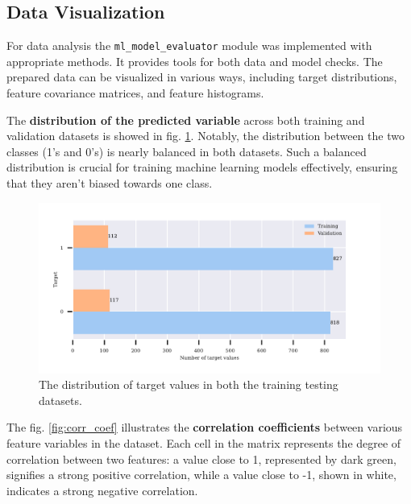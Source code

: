 \subsection{Data Visualization}
For data analysis the \texttt{ml\_model\_evaluator} module was implemented with appropriate methods. It provides tools for both data and model checks.
The prepared data can be visualized in various ways, including target distributions, feature covariance matrices, and feature histograms.

The \textbf{distribution of the predicted variable} across both training and validation datasets is showed in fig. \ref{fig:signal_distribution}.
Notably, the distribution between the two classes (1's and 0's) is nearly balanced in both datasets. Such a balanced distribution is crucial for training machine learning models effectively, ensuring that they aren't biased towards one class.

\begin{figure}[h]
\centering
\begin{adjustbox}{max width=1\textwidth,center}
    \includegraphics[scale=1]{./pdf/report/sig_distr.pdf}
\end{adjustbox}
    \caption{The distribution of target values in both the training testing datasets.}
\label{fig:signal_distribution}
\end{figure}

The fig. \ref{fig:corr_coef} illustrates the \textbf{correlation coefficients} between various feature variables in the dataset.
Each cell in the matrix represents the degree of correlation between two features: a value close to 1, represented by dark green, signifies a strong positive correlation, while a value close to -1, shown in white, indicates a strong negative correlation.

